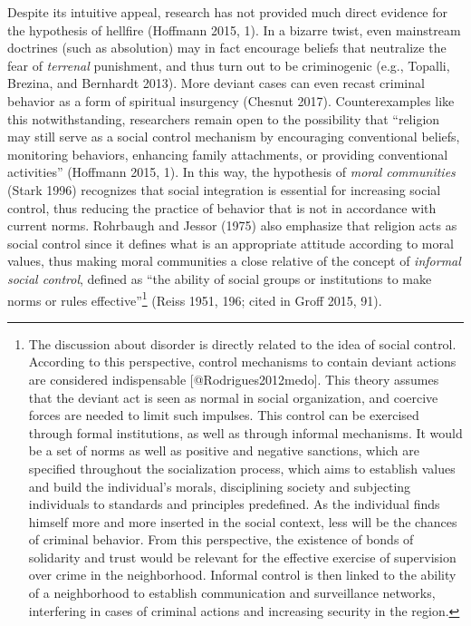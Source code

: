 \documentclass[smallextended]{svjour3}       %
\begin{document}
Despite its intuitive appeal, research has not provided much direct
evidence for the hypothesis of hellfire (Hoffmann 2015, 1). In a bizarre
twist, even mainstream doctrines (such as absolution) may in fact
encourage beliefs that neutralize the fear of \emph{terrenal}
punishment, and thus turn out to be criminogenic (e.g., Topalli,
Brezina, and Bernhardt 2013). More deviant cases can even recast
criminal behavior as a form of spiritual insurgency (Chesnut 2017).
Counterexamples like this notwithstanding, researchers remain open to
the possibility that ``religion may still serve as a social control
mechanism by encouraging conventional beliefs, monitoring behaviors,
enhancing family attachments, or providing conventional activities''
(Hoffmann 2015, 1). In this way, the hypothesis of \emph{moral
communities} (Stark 1996) recognizes that social integration is
essential for increasing social control, thus reducing the practice of
behavior that is not in accordance with current norms. Rohrbaugh and
Jessor (1975) also emphasize that religion acts as social control since
it defines what is an appropriate attitude according to moral values,
thus making moral communities a close relative of the concept of
\emph{informal social control}, defined as ``the ability of social
groups or institutions to make norms or rules
effective''\footnote{The discussion about disorder is directly related to the idea of social control. According to this perspective, control mechanisms to contain deviant actions are considered indispensable [@Rodrigues2012medo]. This theory assumes that the deviant act is seen as normal in social organization, and coercive forces are needed to limit such impulses. This control can be exercised through formal institutions, as well as through informal mechanisms. It would be a set of norms as well as positive and negative sanctions, which are specified throughout the socialization process, which aims to establish values and build the individual's morals, disciplining society and subjecting individuals to standards and principles predefined. As the individual finds himself more and more inserted in the social context, less will be the chances of criminal behavior. From this perspective, the existence of bonds of solidarity and trust would be relevant for the effective exercise of supervision over crime in the neighborhood. Informal control is then linked to the ability of a neighborhood to establish communication and surveillance networks, interfering in cases of criminal actions and increasing security in the region.}
(Reiss 1951, 196; cited in Groff 2015, 91).
\end{document}
